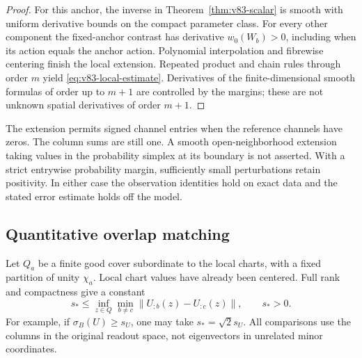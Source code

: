 \begin{proof}
For this anchor, the inverse in Theorem~\ref{thm:v83-scalar} is
smooth with uniform derivative bounds on the compact parameter class.
For every other component the fixed-anchor contrast has derivative
$w_0(W_b)>0$, including when its action equals the anchor action.
Polynomial interpolation and fibrewise centering finish the local
extension. Repeated product and chain rules through order $m$ yield
\eqref{eq:v83-local-estimate}. Derivatives of the finite-dimensional
smooth formulas of order up to $m+1$ are controlled by the margins;
these are not unknown spatial derivatives of order $m+1$.
\end{proof}

The extension permits signed channel entries when the reference
channels have zeros. The column sums are still one. A smooth
open-neighborhood extension taking values in the probability simplex
at its boundary is not asserted. With a strict entrywise probability
margin, sufficiently small perturbations retain positivity. In either
case the observation identities hold on exact data and the stated
error estimate holds off the model.

\subsection{Quantitative overlap matching}
Let $Q_a$ be a finite good cover subordinate to the local charts,
with a fixed partition of unity $\chi_a$. Local chart values have
already been centered. Full rank and compactness give a constant
\begin{equation}\label{eq:v83-signature-gap}
 s_*\le\inf_{z\in Q}\min_{b\ne c}
                    \|U_{:b}(z)-U_{:c}(z)\|,
                 \qquad s_*>0.
\end{equation}
For example, if $\sigma_B(U)\ge s_U$, one may take
$s_*=\sqrt2s_U$. All comparisons use the columns in the original
readout space, not eigenvectors in unrelated minor coordinates.

